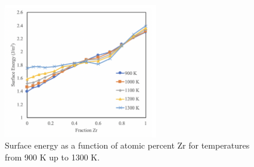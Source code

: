 \documentclass[review]{elsarticle}
\providecommand{\DIFdeltex}[1]{} %
\providecommand{\DIFdelFL}[1]{\DIFdel{#1}} %
\providecommand{\DIFdelbeginFL}{} %
\providecommand{\DIFdelendFL}{} %
\providecommand{\DIFdel}[1]{\texorpdfstring{\DIFdeltex{#1}}{}} %
\newcommand{\DIFscaledelfig}{0.5}
\newlength{\DIFdelgraphicswidth} %
\newlength{\DIFdelgraphicsheight} %
\newcommand{\DIFdelincludegraphics}[2][]{%
\sbox{\DIFdelgraphicsbox}{\DIFOincludegraphics[#1]{#2}}%
\settoboxwidth{\DIFdelgraphicswidth}{\DIFdelgraphicsbox} %
\settoboxtotalheight{\DIFdelgraphicsheight}{\DIFdelgraphicsbox} %
\scalebox{\DIFscaledelfig}{%
\parbox[b]{\DIFdelgraphicswidth}{\usebox{\DIFdelgraphicsbox}\\[-\baselineskip] \rule{\DIFdelgraphicswidth}{0em}}\llap{\resizebox{\DIFdelgraphicswidth}{\DIFdelgraphicsheight}{%
\setlength{\unitlength}{\DIFdelgraphicswidth}%
\begin{picture}(1,1)%
\thicklines\linethickness{2pt} %
{\color[rgb]{1,0,0}\put(0,0){\framebox(1,1){}}}%
{\color[rgb]{1,0,0}\put(0,0){\line( 1,1){1}}}%
{\color[rgb]{1,0,0}\put(0,1){\line(1,-1){1}}}%
\end{picture}%
}\hspace*{3pt}}} %
} %
\DeclareRobustCommand{\DIFdelbeginFL}{\DIFOdelbeginFL \let\includegraphics\DIFdelincludegraphics} %
\DeclareRobustCommand{\DIFdelendFL}{\DIFOaddendFL \let\includegraphics\DIFOincludegraphics} %
\begin{document}
\begin{figure}[!htp]
\begin{center}
\DIFdelbeginFL %
{%
\DIFdelFL{An example void in U-10Zr at 1200 K. The void is approximately 5 nm in diameter. }}

\DIFdelendFL \includegraphics[width=0.6\textwidth]{8_Esurf}
\end{center}
\caption{Surface energy as a function of atomic percent Zr for temperatures from 900 K up to 1300 K.}
\label{fig:Esurf}
\end{figure}

\FloatBarrier
\end{document}

